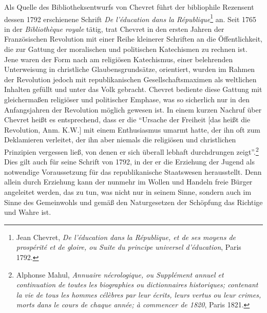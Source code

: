 Als Quelle des Bibliotheksentwurfs von Chevret führt der bibliophile
Rezensent dessen 1792 erschienene Schrift \emph{De l'éducation dans la
République}\footnote{Jean Chevret, \emph{De l'éducation dans la
  République, et de ses moyens de prospérité et de gloire, ou Suite du
  principe universel d'éducation}, Paris 1792.} an. Seit 1765 in der
\emph{Bibliothèque royale} tätig, trat Chevret in den ersten Jahren der
Französischen Revolution mit einer Reihe kleinerer Schriften an die
Öffentlichkeit, die zur Gattung der moralischen und politischen
Katechismen zu rechnen ist. Jene waren der Form nach am religiösen
Katechismus, einer belehrenden Unterweisung in christliche
Glaubensgrundsätze, orientiert, wurden im Rahmen der Revolution jedoch
mit republikanischen Gesellschaftsmaximen als weltlichen Inhalten
gefüllt und unter das Volk gebracht. Chevret bediente diese Gattung mit
gleichermaßen religiöser und politischer Emphase, was so sicherlich nur
in den Anfangsjahren der Revolution möglich gewesen ist. In einem kurzen
Nachruf über Chevret heißt es entsprechend, dass er die \enquote{Ursache
der Freiheit {[}das heißt die Revolution, Anm. K.W.{]} mit einem
Enthusiasmus umarmt hatte, der ihn oft zum Deklamieren verleitet, der
ihn aber niemals die religiösen und christlichen Prinzipien vergessen
ließ, von denen er sich überall lebhaft durchdrungen zeigt}.\footnote{Alphonse
  Mahul, \emph{Annuaire nécrologique, ou Supplément annuel et
  continuation de toutes les biographies ou dictionnaires historiques;
  contenant la vie de tous les hommes célèbres par leur écrits, leurs
  vertus ou leur crimes, morts dans le cours de chaque année; à
  commencer de 1820}, Paris 1821.} Dies gilt auch für seine Schrift von
1792, in der er die Erziehung der Jugend als notwendige Voraussetzung
für das republikanische Staatswesen herausstellt. Denn allein durch
Erziehung kann der nunmehr im Wollen und Handeln freie Bürger angeleitet
werden, das zu tun, was nicht nur in seinem Sinne, sondern auch im Sinne
des Gemeinwohls und gemäß den Naturgesetzen der Schöpfung das Richtige
und Wahre ist.

